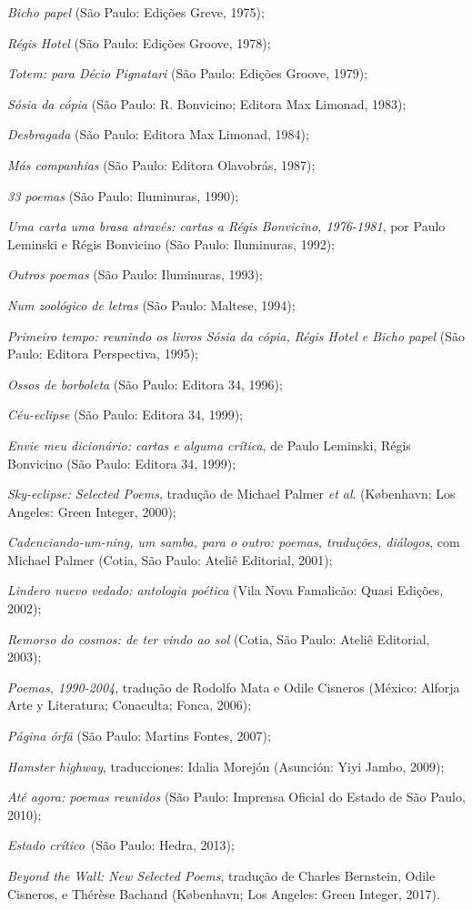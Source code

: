 \begin{Parskip}
\emph{Bicho papel} (São Paulo: Edições Greve, 1975);

\emph{Régis Hotel} (São Paulo: Edições Groove, 1978);

\emph{Totem: para Décio Pignatari} (São Paulo: Edições Groove, 1979);

\emph{Sósia da cópia} (São Paulo: R. Bonvicino; Editora Max Limonad, 1983);

\emph{Desbragada} (São Paulo: Editora Max Limonad, 1984);

\emph{Más companhias} (São Paulo: Editora Olavobrás, 1987);

\emph{33 poemas} (São Paulo: Iluminuras, 1990);

\emph{Uma carta uma brasa através: cartas a Régis Bonvicino, 1976-1981},
por Paulo Leminski e Régis Bonvicino (São Paulo: Iluminuras, 1992);

\emph{Outros poemas} (São Paulo: Iluminuras, 1993);

\emph{Num zoológico de letras} (São Paulo: Maltese, 1994);

\emph{Primeiro tempo: reunindo os livros Sósia da cópia, Régis Hotel e
Bicho papel} (São Paulo: Editora Perspectiva, 1995);

\emph{Ossos de borboleta} (São Paulo: Editora 34, 1996);

\emph{Céu-eclipse} (São Paulo: Editora 34, 1999);

\emph{Envie meu dicionário: cartas e alguma crítica}, de Paulo Leminski,
Régis Bonvicino (São Paulo: Editora 34, 1999);

\emph{Sky-eclipse: Selected Poems}, tradução de Michael Palmer \emph{et
al}. (København; Los Angeles: Green Integer, 2000);

\emph{Cadenciando-um-ning, um samba, para o outro: poemas, traduções,
diálogos}, com Michael Palmer (Cotia, São Paulo: Ateliê Editorial, 2001);

\emph{Lindero nuevo vedado: antologia poética} (Vila Nova Famalicão:
Quasi Edições, 2002);

\emph{Remorso do cosmos: de ter vindo ao sol} (Cotia, São Paulo: Ateliê
Editorial, 2003);

\emph{Poemas, 1990-2004}, tradução de Rodolfo Mata e Odile
Cisneros (México: Alforja Arte y Literatura; Conaculta; Fonca, 2006);

\emph{Página órfã} (São Paulo: Martins Fontes, 2007);

\emph{Hamster highway}, traducciones: Idalia Morejón (Asunción: Yiyi Jambo, 2009);

\emph{Até agora: poemas reunidos} (São Paulo: Imprensa Oficial do Estado de São Paulo, 2010);

\emph{Estado crítico}~(São Paulo: Hedra, 2013);

\emph{Beyond the Wall: New Selected Poems}, tradução de Charles
Bernstein, Odile Cisneros, e Thérèse Bachand (København; Los Angeles:
Green Integer, 2017).
\end{Parskip}

